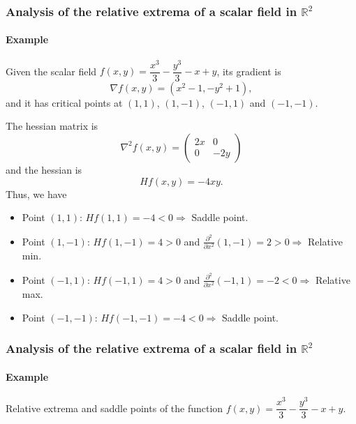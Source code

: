 \begin{frame}
\frametitle{Analysis of the relative extrema of a scalar field in $\mathbb{R}^2$}
\framesubtitle{Example}
Given the scalar field $f(x,y)=\dfrac{x^3}{3}-\dfrac{y^3}{3}-x+y$, its gradient is
\[
\nabla f(x,y)= (x^2-1,-y^2+1),
\]
and it has critical points at $(1,1)$, $(1,-1)$, $(-1,1)$ and $(-1,-1)$.

The hessian matrix is
\[
\nabla^2f(x,y) = \left(
\begin{array}{cc}
2x & 0\\
0 & -2y
\end{array}
\right)
\]
and the hessian is 
\[
Hf(x,y) = -4xy.
\]
Thus, we have 
\begin{itemize}
\item Point $(1,1)$: $Hf(1,1)=-4<0 \Rightarrow$ Saddle point.
\item Point $(1,-1)$: $Hf(1,-1)=4>0$ and $\frac{\partial^2}{\partial x^2}(1,-1)=2>0 \Rightarrow$ Relative min.
\item Point $(-1,1)$: $Hf(-1,1)=4>0$ and $\frac{\partial^2}{\partial x^2}(-1,1)=-2<0 \Rightarrow$ Relative max.
\item Point $(-1,-1)$: $Hf(-1,-1)=-4<0 \Rightarrow$ Saddle point.
\end{itemize}
\end{frame}


\begin{frame}
\frametitle{Analysis of the relative extrema of a scalar field in $\mathbb{R}^2$}
\framesubtitle{Example}
Relative extrema and saddle points of the function $f(x,y)=\dfrac{x^3}{3}-\dfrac{y^3}{3}-x+y$.
\begin{center}

\end{center}
\end{frame}

